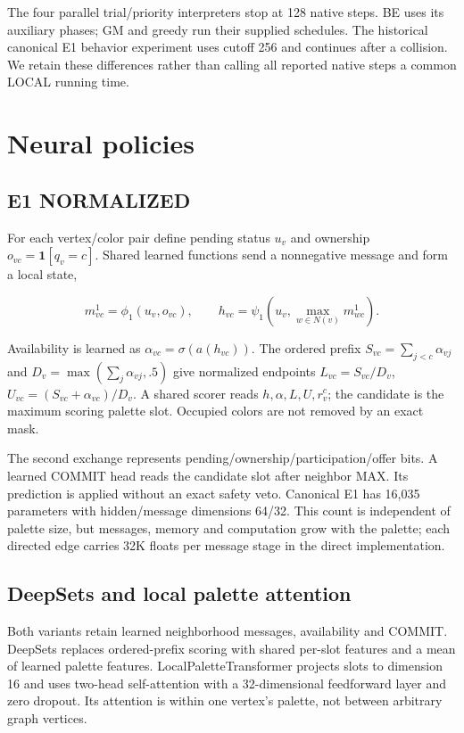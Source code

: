 \documentclass[
  11pt,
]{article}
\begin{document}
The four parallel trial/priority interpreters stop at 128 native steps.
BE uses its auxiliary phases; GM and greedy run their supplied
schedules. The historical canonical E1 behavior experiment uses cutoff
256 and continues after a collision. We retain these differences rather
than calling all reported native steps a common LOCAL running time.

\section{Neural policies}\label{neural-policies}

\subsection{E1 NORMALIZED}\label{e1-normalized}

For each vertex/color pair define pending status \(u_v\) and ownership
\(o_{vc}=\mathbf1[q_v=c]\). Shared learned functions send a nonnegative
message and form a local state,

\[m^1_{vc}=\phi_1(u_v,o_{vc}),\qquad
h_{vc}=\psi_1(u_v,\max_{w\in N(v)}m^1_{wc}).\]

Availability is learned as \(\alpha_{vc}=\sigma(a(h_{vc}))\). The
ordered prefix \(S_{vc}=\sum_{j<c}\alpha_{vj}\) and
\(D_v=\max(\sum_j\alpha_{vj},.5)\) give normalized endpoints
\(L_{vc}=S_{vc}/D_v\), \(U_{vc}=(S_{vc}+\alpha_{vc})/D_v\). A shared
scorer reads \(h,\alpha,L,U,r_v^c\); the candidate is the maximum
scoring palette slot. Occupied colors are not removed by an exact mask.

The second exchange represents pending/ownership/participation/offer
bits. A learned COMMIT head reads the candidate slot after neighbor MAX.
Its prediction is applied without an exact safety veto. Canonical E1 has
16,035 parameters with hidden/message dimensions 64/32. This count is
independent of palette size, but messages, memory and computation grow
with the palette; each directed edge carries 32K floats per message
stage in the direct implementation.

\subsection{DeepSets and local palette
attention}\label{deepsets-and-local-palette-attention}

Both variants retain learned neighborhood messages, availability and
COMMIT. DeepSets replaces ordered-prefix scoring with shared per-slot
features and a mean of learned palette features. LocalPaletteTransformer
projects slots to dimension 16 and uses two-head self-attention with a
32-dimensional feedforward layer and zero dropout. Its attention is
within one vertex's palette, not between arbitrary graph vertices.
\end{document}

